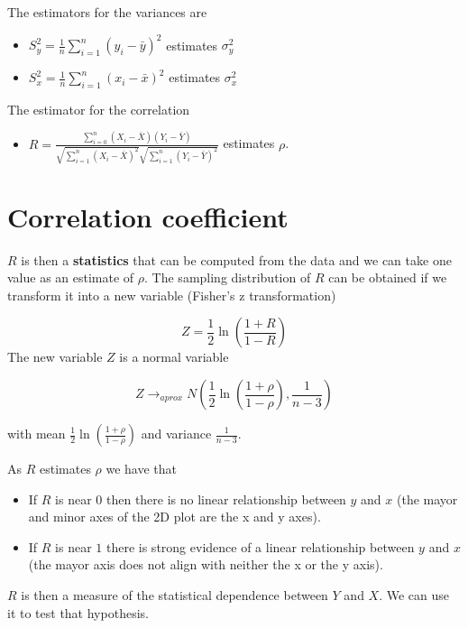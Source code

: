 \documentclass[
]{book}
\providecommand{\tightlist}{%
  \setlength{\itemsep}{0pt}\setlength{\parskip}{0pt}}
\begin{document}
The estimators for the variances are

\begin{itemize}
\tightlist
\item
  \(S^2_y=\frac{1}{n}\sum_{i=1}^n (y_i-\bar{y})^2\) estimates \(\sigma^2_y\)
\item
  \(S^2_x=\frac{1}{n}\sum_{i=1}^n (x_i-\bar{x})^2\) estimates \(\sigma^2_x\)
\end{itemize}

The estimator for the correlation

\begin{itemize}
\tightlist
\item
  \(R=\frac{\sum_{i=0}^n(X_i-\bar{X})(Y_i-\bar{Y})}{\sqrt{\sum_{i=1}^n(X_i-\bar{X})^2}\sqrt{\sum_{i=1}^n(Y_i-\bar{Y})^2}}\) estimates \(\rho\).
\end{itemize}

\hypertarget{correlation-coefficient}{%
\section{Correlation coefficient}\label{correlation-coefficient}}

\(R\) is then a \textbf{statistics} that can be computed from the data and we can take one value as an estimate of \(\rho\). The sampling distribution of \(R\) can be obtained if we transform it into a new variable (Fisher's z transformation)

\[Z=\frac{1}{2}\ln (\frac{1+R}{1-R})\]
The new variable \(Z\) is a normal variable

\[Z \rightarrow_{aprox} N(\frac{1}{2}\ln (\frac{1+\rho}{1-\rho}), \frac{1}{n-3})\]

with mean \(\frac{1}{2}\ln (\frac{1+\rho}{1-\rho})\) and variance \(\frac{1}{n-3}\).

As \(R\) estimates \(\rho\) we have that

\begin{itemize}
\item
  If \(R\) is near \(0\) then there is no linear relationship between \(y\) and \(x\) (the mayor and minor axes of the 2D plot are the x and y axes).
\item
  If \(R\) is near \(1\) there is strong evidence of a linear relationship between \(y\) and \(x\) (the mayor axis does not align with neither the x or the y axis).
\end{itemize}

\(R\) is then a measure of the statistical dependence between \(Y\) and \(X\). We can use it to test that hypothesis.
\end{document}
